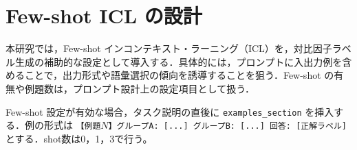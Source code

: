 \section{Few-shot ICL の設計}

本研究では，Few-shot インコンテキスト・ラーニング（ICL）を，対比因子ラベル生成の補助的な設定として導入する．具体的には，プロンプトに入出力例を含めることで，出力形式や語彙選択の傾向を誘導することを狙う．Few-shot の有無や例題数は，プロンプト設計上の設定項目として扱う．

Few-shot 設定が有効な場合，タスク説明の直後に \texttt{examples\_section} を挿入する．例の形式は \texttt{【例題$N$】グループA: [...] グループB: [...] 回答: [正解ラベル]} とする．shot数は0，1，3で行う。
